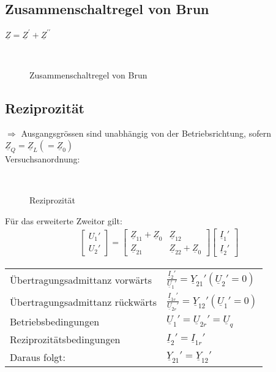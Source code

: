\subsection{Zusammenschaltregel von Brun}
$\underline{Z} = \underline{Z}^\prime + \underline{Z}^{\prime\prime}$\\
\begin{figure}[!h]
\centering
{}
\qquad
{}\\
\caption{Zusammenschaltregel von Brun}
\label{fig:zweitor:regelvbrun}
\end{figure}

\subsection{Reziprozität}
$\Rightarrow$ Ausgangsgrössen sind unabhängig von der Betriebsrichtung, sofern
$\underline{Z}_{Q}=\underline{Z}_{L} \left(=\underline{Z}_{0}\right)$\\
Versuchsanordnung:\\
\begin{figure}[!h]
\centering
\subfloat[Reziprozität]{
	
	\label{fig:zweitor:rezi:links}
}
\qquad
\subfloat[Reziprozität]{
	
	\label{fig:zweitor:rezi:rechts}
}\\
\caption{Reziprozität}
\label{fig:zweitor:rezi}
\end{figure}
Für das erweiterte Zweitor gilt:\\
\begin{align}
	\begin{bmatrix}
		U_1'\\
		U_2'
	\end{bmatrix}
	=	
	\begin{bmatrix}
		\underline{Z}_{11}+\underline{Z}_{0} & \underline{Z}_{12}\\
		\underline{Z}_{21} & \underline{Z}_{22}+\underline{Z}_0
	\end{bmatrix}
	\begin{bmatrix}
		\underline{I}_1'\\
		\underline{I}_2'
	\end{bmatrix}\nonumber
\end{align}
\begin{tabular}{ll}
	Übertragungsadmittanz vorwärts
	& $\frac{\underline{I}_{2}'}{\underline{U}_{1}'}=\underline{Y}_{21}'
	(\underline{U}_{2}'=0)$\\
	Übertragungsadmittanz rückwärts &
	$\frac{\underline{I}_{1r}'}{\underline{U}_{2r}'}=\underline{Y}_{12}'
	(\underline{U}_{1}'=0)$\\
	Betriebsbedingungen
	& $\underline{U}_{1}'=\underline{U}_{2r}'=\underline{U}_{q}$\\
	Reziprozitätsbedingungen &
	$\underline{I}_{2}'=\underline{I}_{1r}'$\\ 
	Daraus folgt: &
	$\underline{Y}_{21}'=\underline{Y}_{12}'$\\
\end{tabular}\\
